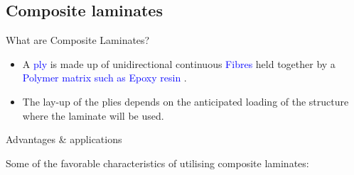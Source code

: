 \documentclass[10pt,aspectratio=169]{beamer} %
\begin{document}
\subsection{Composite laminates}
\begin{frame}{What are Composite Laminates?}
	\begin{minipage}[c]{.3\textwidth}
		\small
		\begin{itemize}
			\item A \textcolor{blue}{ply} is made up of unidirectional continuous \textcolor{blue}{Fibres} held together by a \textcolor{blue}{Polymer matrix such as Epoxy resin} .			
			\item The lay-up of the plies depends on the anticipated loading of the structure where the laminate will be used.
		\end{itemize}
	\end{minipage}
	\hfill
	\begin{minipage}[c]{.65\textwidth}
		\begin{figure}
		\end{figure}				
	\end{minipage}
\end{frame}
\begin{frame}{Advantages \& applications}
	\begin{minipage}[c]{.45\textwidth}
		Some of the favorable characteristics of utilising composite laminates:
		\begin{itemize}
		\end{itemize}
	\end{minipage}
	\hfill
\end{frame}
\end{document}
